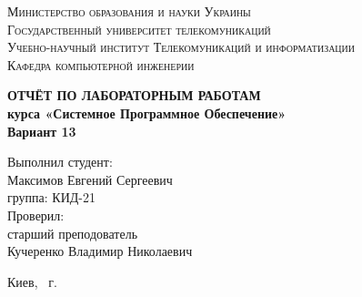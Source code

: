 \documentclass[14pt,a4paper,report]{ncc}
\begin{document}
\renewcommand{\chaptername}{Лабораторная работа}
\def\contentsname{Содержание}

\begin{titlepage}
\begin{center}
\textsc{Министерство образования и науки Украины\\[2mm]
Государственный университет телекомуникаций\\[5mm]
Учебно-научный институт Телекомуникаций и информатизации\\[2mm]
Кафедра компьютерной инженерии}

\vfill

\textbf{ОТЧЁТ ПО ЛАБОРАТОРНЫМ РАБОТАМ\\[3mm]
курса «Системное Программное Обеспечение»\\[6mm]
Вариант 13
\\[20mm]
}
\end{center}

\hfill
\begin{minipage}{.5\textwidth}
Выполнил студент:\\[2mm] 
Максимов Евгений Сергеевич\\
группа: КИД-21\\[5mm]

Проверил:\\[2mm] 
старший преподователь\\
Кучеренко Владимир Николаевич
\end{minipage}%
\vfill
\begin{center}
 Киев, \theyear\ г.
\end{center}
\end{titlepage}

\tableofcontents
\newpage


\end{document}
